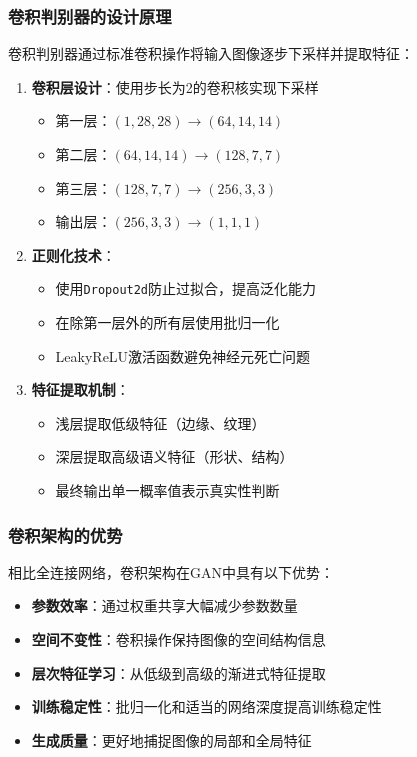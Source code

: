 \documentclass[UTF8]{ctexart}
\begin{document}
\subsubsection{卷积判别器的设计原理}

卷积判别器通过标准卷积操作将输入图像逐步下采样并提取特征：

\begin{enumerate}
\item \textbf{卷积层设计}：使用步长为2的卷积核实现下采样
\begin{itemize}
\item 第一层：$(1, 28, 28) \rightarrow (64, 14, 14)$
\item 第二层：$(64, 14, 14) \rightarrow (128, 7, 7)$
\item 第三层：$(128, 7, 7) \rightarrow (256, 3, 3)$
\item 输出层：$(256, 3, 3) \rightarrow (1, 1, 1)$
\end{itemize}

\item \textbf{正则化技术}：
\begin{itemize}
\item 使用\texttt{Dropout2d}防止过拟合，提高泛化能力
\item 在除第一层外的所有层使用批归一化
\item LeakyReLU激活函数避免神经元死亡问题
\end{itemize}

\item \textbf{特征提取机制}：
\begin{itemize}
\item 浅层提取低级特征（边缘、纹理）
\item 深层提取高级语义特征（形状、结构）
\item 最终输出单一概率值表示真实性判断
\end{itemize}
\end{enumerate}

\subsubsection{卷积架构的优势}

相比全连接网络，卷积架构在GAN中具有以下优势：

\begin{itemize}
\item \textbf{参数效率}：通过权重共享大幅减少参数数量
\item \textbf{空间不变性}：卷积操作保持图像的空间结构信息
\item \textbf{层次特征学习}：从低级到高级的渐进式特征提取
\item \textbf{训练稳定性}：批归一化和适当的网络深度提高训练稳定性
\item \textbf{生成质量}：更好地捕捉图像的局部和全局特征
\end{itemize}
\end{document}
